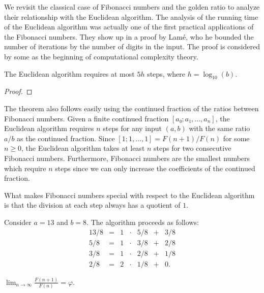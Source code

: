 We revisit the classical case of Fibonacci numbers and the golden ratio
to analyze their relationship with the Euclidean algorithm.
The analysis of the running time of the Euclidean algorithm was actually one of
the first practical applications of the Fibonacci numbers.
They show up in a proof by Lamé, who he bounded the number of iterations by the
number of digits in the input.
The proof is considered by some \cite{TODO} as the beginning of computational
complexity theory.

\begin{theorem}
  \label{thm:lame}
  The Euclidean algorithm requires at most $5h$ steps,
  where $h = \log_{10}(b)$.
\end{theorem}

\begin{proof}
\end{proof}

The theorem also follows easily using the continued fraction of the ratios
between Fibonacci numbers.
Given a finite continued fraction $[a₀; a₁, …, a_n]$, the Euclidean algorithm
requires $n$ steps for any input $(a, b)$ with the same ratio $a/b$ as the
continued fraction.
Since $[1; 1, …, 1] = F(n+1)/F(n)$ for some $n ≥ 0$, the Euclidean algorithm
takes at least $n$ steps for two consecutive Fibonacci numbers.
Furthermore, Fibonacci numbers are the smallest numbers which require $n$ steps
since we can only increase the coefficients of the continued fraction.

What makes Fibonacci numbers special with respect to the Euclidean algorithm
is that the division at each step always has a quotient of $1$.

\begin{example}
  Consider $a = 13$ and $b = 8$.
  The algorithm proceeds as follows:
  \[
    \begin{array}{rclcrcl}
      13/8 & = & 1 & · & 5/8 & + & 3/8 \\
       5/8 & = & 1 & · & 3/8 & + & 2/8 \\
       3/8 & = & 1 & · & 2/8 & + & 1/8 \\
       2/8 & = & 2 & · & 1/8 & + & 0.
    \end{array}
  \]
\end{example}

\begin{theorem}
  $\lim_{n → ∞} \frac{F(n+1)}{F(n)} = φ$.
\end{theorem}


